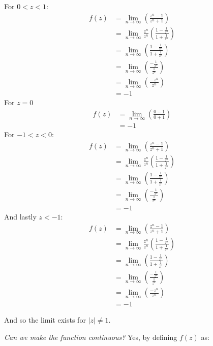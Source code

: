 \begin{enumerate}
	For $0 < z < 1$:
	\begin{align*}
		f(z) &= \lim_{n \to \infty} \left( \frac{z^n - 1}{z^n + 1} \right) \\
		&= \lim_{n \to \infty} \frac{z^n}{z^n} \left( \frac{1 - \frac{1}{z^n}}{1 + \frac{1}{z^n}} \right) \\
		&= \lim_{n \to \infty} \left( \frac{1 - \frac{1}{z^n}}{1 + \frac{1}{z^n}} \right) \\
		&= \lim_{n \to \infty} \left( \frac{- \frac{1}{z^n}}{\frac{1}{z^n}} \right) \\
		&= \lim_{n \to \infty} \left( \frac{- z^n}{{z^n}} \right) \\
		&= -1
	\end{align*}
	For $z = 0$
	\begin{align*}
		f(z) &= \lim_{n \to \infty} \left( \frac{0 - 1}{0 + 1} \right) \\
		&= -1
	\end{align*}
	For $ -1 < z < 0$:
	\begin{align*}
		f(z) &= \lim_{n \to \infty} \left( \frac{z^n - 1}{z^n + 1} \right) \\
		&= \lim_{n \to \infty} \frac{z^n}{z^n} \left( \frac{1 - \frac{1}{z^n}}{1 + \frac{1}{z^n}} \right) \\
		&= \lim_{n \to \infty} \left( \frac{1 - \frac{1}{z^n}}{1 + \frac{1}{z^n}} \right) \\
		&= \lim_{n \to \infty} \left( \frac{- \frac{1}{z^n}}{\frac{1}{z^n}} \right) \\
		&= -1
	\end{align*}
	And lastly $z < -1$:
	\begin{align*}
		f(z) &= \lim_{n \to \infty} \left( \frac{z^n - 1}{z^n + 1} \right) \\
		&= \lim_{n \to \infty} \frac{z^n}{z^n} \left( \frac{1 - \frac{1}{z^n}}{1 + \frac{1}{z^n}} \right) \\
		&= \lim_{n \to \infty} \left( \frac{1 - \frac{1}{z^n}}{1 + \frac{1}{z^n}} \right) \\
		&= \lim_{n \to \infty} \left( \frac{- \frac{1}{z^n}}{\frac{1}{z^n}} \right) \\
		&= \lim_{n \to \infty} \left( \frac{- z^n}{{z^n}} \right) \\
		&= -1
	\end{align*}

	And so the limit exists for $|z| \not = 1.$
	
	\emph{Can we make the function continuous?} Yes, by defining $f(z)$ as:
	

\end{enumerate}
